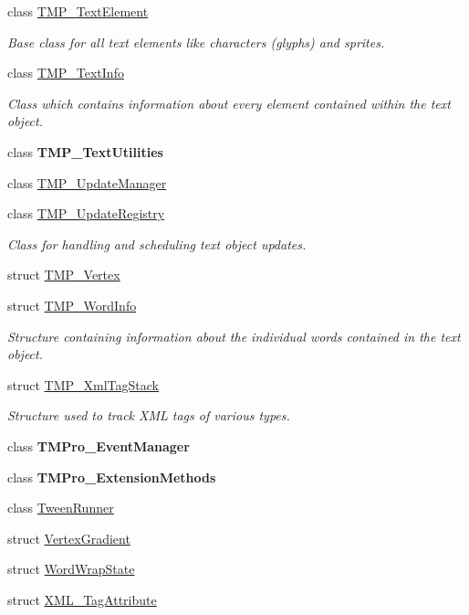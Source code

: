 \begin{DoxyCompactItemize}
class \mbox{\hyperlink{class_t_m_pro_1_1_t_m_p___text_element}{T\+M\+P\+\_\+\+Text\+Element}}
\begin{DoxyCompactList}\small\item\em Base class for all text elements like characters (glyphs) and sprites. \end{DoxyCompactList}\item 
class \mbox{\hyperlink{class_t_m_pro_1_1_t_m_p___text_info}{T\+M\+P\+\_\+\+Text\+Info}}
\begin{DoxyCompactList}\small\item\em Class which contains information about every element contained within the text object. \end{DoxyCompactList}\item 
class {\bfseries T\+M\+P\+\_\+\+Text\+Utilities}
\item 
class \mbox{\hyperlink{class_t_m_pro_1_1_t_m_p___update_manager}{T\+M\+P\+\_\+\+Update\+Manager}}
\item 
class \mbox{\hyperlink{class_t_m_pro_1_1_t_m_p___update_registry}{T\+M\+P\+\_\+\+Update\+Registry}}
\begin{DoxyCompactList}\small\item\em Class for handling and scheduling text object updates. \end{DoxyCompactList}\item 
struct \mbox{\hyperlink{struct_t_m_pro_1_1_t_m_p___vertex}{T\+M\+P\+\_\+\+Vertex}}
\item 
struct \mbox{\hyperlink{struct_t_m_pro_1_1_t_m_p___word_info}{T\+M\+P\+\_\+\+Word\+Info}}
\begin{DoxyCompactList}\small\item\em Structure containing information about the individual words contained in the text object. \end{DoxyCompactList}\item 
struct \mbox{\hyperlink{struct_t_m_pro_1_1_t_m_p___xml_tag_stack}{T\+M\+P\+\_\+\+Xml\+Tag\+Stack}}
\begin{DoxyCompactList}\small\item\em Structure used to track X\+ML tags of various types. \end{DoxyCompactList}\item 
class {\bfseries T\+M\+Pro\+\_\+\+Event\+Manager}
\item 
class {\bfseries T\+M\+Pro\+\_\+\+Extension\+Methods}
\item 
class \mbox{\hyperlink{class_t_m_pro_1_1_tween_runner}{Tween\+Runner}}
\item 
struct \mbox{\hyperlink{struct_t_m_pro_1_1_vertex_gradient}{Vertex\+Gradient}}
\item 
struct \mbox{\hyperlink{struct_t_m_pro_1_1_word_wrap_state}{Word\+Wrap\+State}}
\item 
struct \mbox{\hyperlink{struct_t_m_pro_1_1_x_m_l___tag_attribute}{X\+M\+L\+\_\+\+Tag\+Attribute}}
\end{DoxyCompactItemize}
